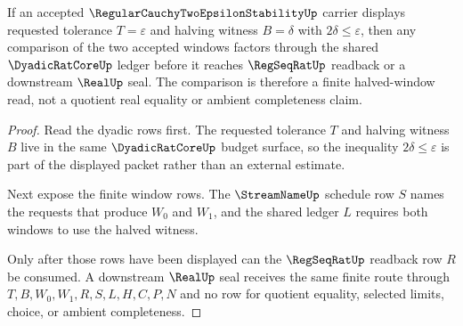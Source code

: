 \begin{theorem}
\label{thm:regular-cauchy-two-epsilon-stability-window-halving}
If an accepted $\RegularCauchyTwoEpsilonStabilityUp$ carrier displays requested tolerance $T=\varepsilon$ and halving witness $B=\delta$ with $2\delta\leq\varepsilon$, then any comparison of the two accepted windows factors through the shared $\DyadicRatCoreUp$ ledger before it reaches $\RegSeqRatUp$ readback or a downstream $\RealUp$ seal. The comparison is therefore a finite halved-window read, not a quotient real equality or ambient completeness claim.
\end{theorem}
\begin{proof}
Read the dyadic rows first. The requested tolerance $T$ and halving witness $B$ live in the same $\DyadicRatCoreUp$ budget surface, so the inequality $2\delta\leq\varepsilon$ is part of the displayed packet rather than an external estimate.

Next expose the finite window rows. The $\StreamNameUp$ schedule row $S$ names the requests that produce $W_0$ and $W_1$, and the shared ledger $L$ requires both windows to use the halved witness.

Only after those rows have been displayed can the $\RegSeqRatUp$ readback row $R$ be consumed. A downstream $\RealUp$ seal receives the same finite route through $T,B,W_0,W_1,R,S,L,H,C,P,N$ and no row for quotient equality, selected limits, choice, or ambient completeness.
\end{proof}




